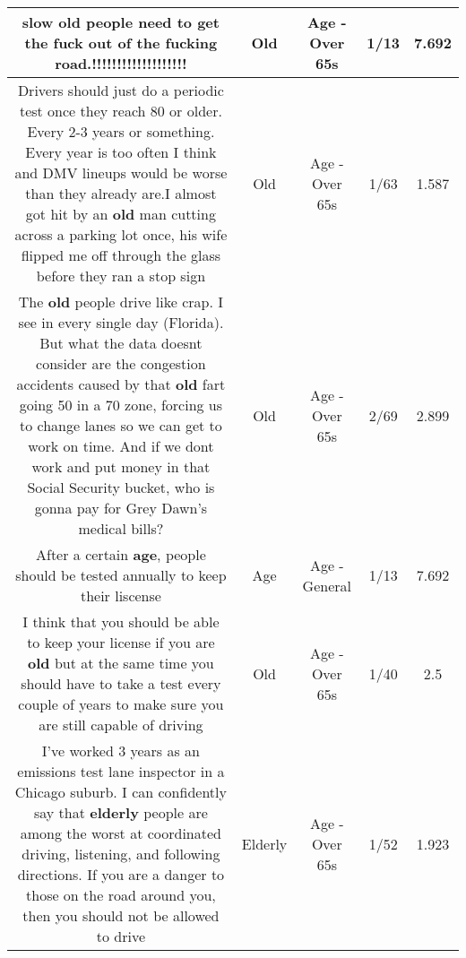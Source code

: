 \documentclass[11pt]{article}
\newlength\mylength
\begin{document}
\begin{center}
\begin{longtable}{|C{.65\mylength}|C{.30\mylength}|C{.12\mylength}|C{.12\mylength}|C{.12\mylength}|}
  \small slow \textbf{old} people need to get the fuck out of the fucking road.!!!!!!!!!!!!!!!!!!!\normalsize   & Old & Age - Over 65s & 1/13 & 7.692 \\  \hline
  \small Drivers should just do a periodic test once they reach 80 or older. Every 2-3 years or something. Every year is too often I think and DMV lineups would be worse than they already are.I almost got hit by an \textbf{old} man cutting across a parking lot once, his wife flipped me off through the glass before they ran a stop sign\normalsize   & Old & Age - Over 65s & 1/63 & 1.587 \\  \hline
  \small The \textbf{old} people drive like crap. I see in every single day (Florida). But what the data doesnt consider are the congestion accidents caused by that \textbf{old} fart going 50 in a 70 zone, forcing us to change lanes so we can get to work on time. And if we dont work and put money in that Social Security bucket, who is gonna pay for Grey Dawn's medical bills?\normalsize   & Old & Age - Over 65s & 2/69 & 2.899 \\  \hline
  \small After a certain \textbf{age}, people should be tested annually to keep their liscense\normalsize   & Age & Age - General & 1/13 & 7.692 \\  \hline
  \small I think that you should be able to keep your license if you are \textbf{old} but at the same time you should have to take a test every couple of years to make sure you are still capable of driving\normalsize   & Old & Age - Over 65s & 1/40 & 2.5 \\  \hline
  \small I've worked 3 years as an emissions test lane inspector in a Chicago suburb. I can confidently say that \textbf{elderly} people are among the worst at coordinated driving, listening, and following directions. If you are a danger to those on the road around you, then you should not be allowed to drive\normalsize   & Elderly & Age - Over 65s & 1/52 & 1.923 \\  \hline

\end{longtable}
\end{center}
\end{document}
